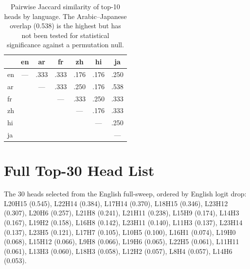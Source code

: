 \documentclass[11pt]{article}
\begin{document}
\begin{table}[h]
\centering
\small
\begin{tabular}{lcccccc}
\toprule
 & \textbf{en} & \textbf{ar} & \textbf{fr} & \textbf{zh} & \textbf{hi} & \textbf{ja} \\
\midrule
en & --- & .333 & .333 & .176 & .176 & .250 \\
ar & & --- & .333 & .250 & .176 & .538 \\
fr & & & --- & .333 & .250 & .333 \\
zh & & & & --- & .176 & .333 \\
hi & & & & & --- & .250 \\
ja & & & & & & --- \\
\bottomrule
\end{tabular}
\caption{Pairwise Jaccard similarity of top-10 heads by language. The Arabic--Japanese overlap (0.538) is the highest but has not been tested for statistical significance against a permutation null.}
\label{tab:overlap}
\end{table}

\section{Full Top-30 Head List}
\label{app:top30}

The 30 heads selected from the English full-sweep, ordered by English logit drop: L20H15 (0.545), L22H14 (0.384), L17H14 (0.370), L18H15 (0.346), L23H12 (0.307), L20H6 (0.257), L21H8 (0.241), L21H11 (0.238), L15H9 (0.174), L14H3 (0.167), L19H2 (0.158), L16H8 (0.142), L23H11 (0.140), L11H3 (0.137), L23H14 (0.137), L23H5 (0.121), L17H7 (0.105), L10H5 (0.100), L16H1 (0.074), L19H0 (0.068), L15H12 (0.066), L9H8 (0.066), L19H6 (0.065), L22H5 (0.061), L11H11 (0.061), L13H3 (0.060), L18H3 (0.058), L12H2 (0.057), L8H4 (0.057), L14H6 (0.053).
\end{document}

